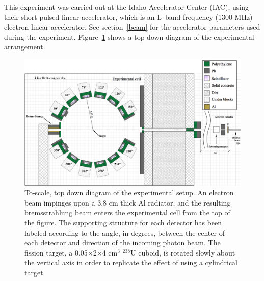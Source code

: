 This experiment was carried out at the Idaho Accelerator Center (IAC), using their short-pulsed linear accelerator, which is an L--band frequency (1300 MHz) electron linear accelerator.
See section~\ref{beam} for the accelerator parameters used during the experiment.
Figure~\ref{fig:Facility} shows a top-down diagram of the experimental arrangement.

\begin{figure}[h]
\includegraphics[width=\FigFacilitySize\textwidth, angle=\Angle]{ExpArangment.jpg}
\caption{To-scale, top down diagram of the experimental setup.
An electron beam impinges upon a 3.8 cm thick Al radiator, and the resulting bremsstrahlung beam enters the experimental cell from the top of the figure.
The supporting structure for each detector has been labeled according to the angle, in degrees, between the center of each detector and direction of the incoming photon beam.
The fission target, a 0.05$\times$2$\times$4 cm$^3$ $^{238}$U cuboid, is rotated slowly about the vertical axis in order to replicate the effect of using a cylindrical target.
}
\label{fig:Facility}
\end{figure}
\figFacilityBarrier

